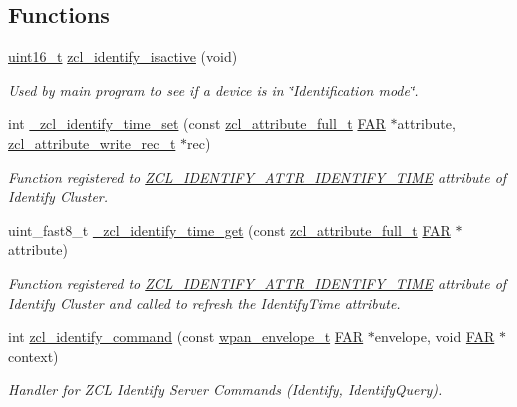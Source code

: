 \subsection*{Functions}
\begin{DoxyCompactItemize}
\item 
\hyperlink{group__hal__dos_ga5a8b2dc9e45a9ee81a94ef304fb62505}{uint16\+\_\+t} \hyperlink{group__zcl__identify_ga95b00d55b861c1ea6033c16794ae818d}{zcl\+\_\+identify\+\_\+isactive} (void)
\begin{DoxyCompactList}\small\item\em Used by main program to see if a device is in \char`\"{}\+Identification mode\char`\"{}. \end{DoxyCompactList}\item 
int \hyperlink{group__zcl__identify_ga40470468c9c1fe4ebfb52612234710b0}{\+\_\+zcl\+\_\+identify\+\_\+time\+\_\+set} (const \hyperlink{structzcl__attribute__full__t}{zcl\+\_\+attribute\+\_\+full\+\_\+t} \hyperlink{group__hal_gaef060b3456fdcc093a7210a762d5f2ed}{F\+AR} $\ast$attribute, \hyperlink{structzcl__attribute__write__rec__t}{zcl\+\_\+attribute\+\_\+write\+\_\+rec\+\_\+t} $\ast$rec)
\begin{DoxyCompactList}\small\item\em Function registered to \hyperlink{group__zcl__identify_ga7df877a02f273adc190aa24ad0aff4c9}{Z\+C\+L\+\_\+\+I\+D\+E\+N\+T\+I\+F\+Y\+\_\+\+A\+T\+T\+R\+\_\+\+I\+D\+E\+N\+T\+I\+F\+Y\+\_\+\+T\+I\+ME} attribute of Identify Cluster. \end{DoxyCompactList}\item 
uint\+\_\+fast8\+\_\+t \hyperlink{group__zcl__identify_ga7cde47425d0a779f5aff87985ea01951}{\+\_\+zcl\+\_\+identify\+\_\+time\+\_\+get} (const \hyperlink{structzcl__attribute__full__t}{zcl\+\_\+attribute\+\_\+full\+\_\+t} \hyperlink{group__hal_gaef060b3456fdcc093a7210a762d5f2ed}{F\+AR} $\ast$attribute)
\begin{DoxyCompactList}\small\item\em Function registered to \hyperlink{group__zcl__identify_ga7df877a02f273adc190aa24ad0aff4c9}{Z\+C\+L\+\_\+\+I\+D\+E\+N\+T\+I\+F\+Y\+\_\+\+A\+T\+T\+R\+\_\+\+I\+D\+E\+N\+T\+I\+F\+Y\+\_\+\+T\+I\+ME} attribute of Identify Cluster and called to refresh the Identify\+Time attribute. \end{DoxyCompactList}\item 
int \hyperlink{group__zcl__identify_ga94a1fe7c8892b55e0ffd3e2795139b1d}{zcl\+\_\+identify\+\_\+command} (const \hyperlink{structwpan__envelope__t}{wpan\+\_\+envelope\+\_\+t} \hyperlink{group__hal_gaef060b3456fdcc093a7210a762d5f2ed}{F\+AR} $\ast$envelope, void \hyperlink{group__hal_gaef060b3456fdcc093a7210a762d5f2ed}{F\+AR} $\ast$context)
\begin{DoxyCompactList}\small\item\em Handler for Z\+CL Identify Server Commands (Identify, Identify\+Query). \end{DoxyCompactList}\end{DoxyCompactItemize}
